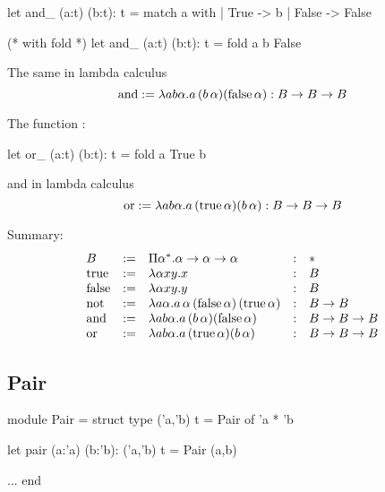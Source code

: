 \begin{ocaml}
  let and_ (a:t) (b:t): t =
    match a with
    | True -> b
    | False -> False

  (* with fold *)
  let and_ (a:t) (b:t): t =
    fold a b False
\end{ocaml}

The same in lambda calculus
$$
\text{and}
:= \lambda a b \alpha. a \, (b\, \alpha) (\text{false}\, \alpha)
: B \to B \to B
$$


The function :
\begin{ocaml}
  let or_ (a:t) (b:t): t =
    fold a True b
\end{ocaml}
%
and in lambda calculus
$$
\text{or}
:= \lambda a b \alpha. a \, (\text{true} \, \alpha) (b \, \alpha)
: B \to B \to B
$$



Summary:
$$
%
\begin{array}{lllll}
  \Bool
  &:=& \Pi \alpha^* . \alpha\to\alpha\to\alpha
  &:& *

  \\

  \true
  &:=& \lambda \alpha x y . x
  &:& \Bool

  \\

  \false
  &:=& \lambda \alpha x y . y
  &:& \Bool

  \\

  \text{not}
  &:=& \lambda a \alpha .
  a \, \alpha \, (\false\,\alpha) \, (\true \, \alpha)
  &:& \Bool \to \Bool

  \\

  \andb
  &:=& \lambda a b \alpha. a \, (b\, \alpha) (\false\, \alpha)
  &:& \Bool \to \Bool \to \Bool

  \\

  \orb
  &:=& \lambda a b \alpha. a \, (\true \, \alpha) (b \, \alpha)
  &:& \Bool \to \Bool \to \Bool
\end{array}
$$



\subsection{Pair}

\begin{ocaml}
  module Pair =
    struct
      type ('a,'b) t = Pair of 'a * 'b

      let pair (a:'a) (b:'b): ('a,'b) t =
        Pair (a,b)

      ...
    end
\end{ocaml}


